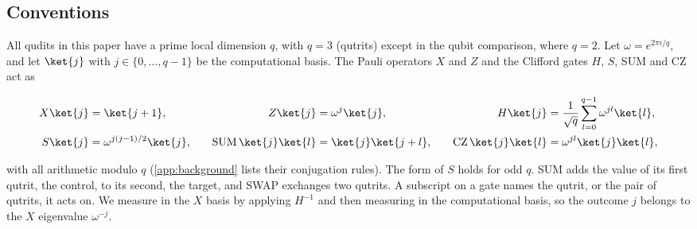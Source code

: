 \subsection{Conventions}
\label{sub:conventions}

All qudits in this paper have a prime local dimension $q$, with $q = 3$ (qutrits) except in the qubit comparison, where $q = 2$. Let $\omega = e^{2\pi i/q}$, and let $\ket{j}$ with $j \in \{0, \dots, q-1\}$ be the computational basis. The Pauli operators $X$ and $Z$ and the Clifford gates $H$, $S$, SUM and CZ act as
\begin{widetext}
\begin{equation}
  \begin{aligned}
    X\ket{j} &= \ket{j+1}, &\quad Z\ket{j} &= \omega^{j}\ket{j}, &\quad H\ket{j} &= \frac{1}{\sqrt{q}}\sum_{l=0}^{q-1}\omega^{jl}\ket{l}, \\
    S\ket{j} &= \omega^{j(j-1)/2}\ket{j}, &\quad \mathrm{SUM}\,\ket{j}\ket{l} &= \ket{j}\ket{j+l}, &\quad \mathrm{CZ}\,\ket{j}\ket{l} &= \omega^{jl}\ket{j}\ket{l},
  \end{aligned}
  \label{eq:conventions}
\end{equation}
\end{widetext}
with all arithmetic modulo $q$ (\autoref{app:background} lists their conjugation rules). The form of $S$ holds for odd $q$. SUM adds the value of its first qutrit, the control, to its second, the target, and SWAP exchanges two qutrits. A subscript on a gate names the qutrit, or the pair of qutrits, it acts on. We measure in the $X$ basis by applying $H^{-1}$ and then measuring in the computational basis, so the outcome $j$ belongs to the $X$ eigenvalue $\omega^{-j}$.
